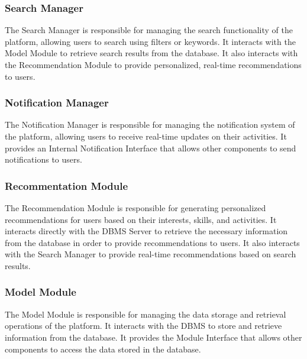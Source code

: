 \subsubsection{Search Manager}
The Search Manager is responsible for managing the search functionality of the platform, allowing users to search using filters or keywords. It interacts with 
the Model Module to retrieve search results from the database. It also interacts with the Recommendation Module to provide personalized, real-time 
recommendations to users.
\subsubsection{Notification Manager}
The Notification Manager is responsible for managing the notification system of the platform, allowing users to receive real-time updates on their activities.
It provides an Internal Notification Interface that allows other components to send notifications to users.
\subsubsection{Recommentation Module}
The Recommendation Module is responsible for generating personalized recommendations for users based on their interests, skills, and activities. It interacts
directly with the DBMS Server to retrieve the necessary information from the database in order to provide recommendations to users. It also interacts with the 
Search Manager to provide real-time recommendations based on search results.
\subsubsection{Model Module}
The Model Module is responsible for managing the data storage and retrieval operations of the platform. It interacts with the DBMS to store and retrieve
information from the database. It provides the Module Interface that allows other components to access the data stored in the database.



